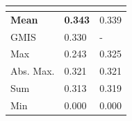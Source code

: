 \begin{figure}
\begin{minipage}[T]{0.48\textwidth}
\begin{tabular}{l M{0.25\textwidth} M{0.25\textwidth}}
         &  &  \\ \midrule
\textbf{Mean}& \textbf{0.343}  & 0.339  \\
GMIS \cite{liu2018affinity} & 0.330 & -  \\
Max &   0.243  &   0.325  \\
Abs. Max.  & 0.321 & 0.321 \\
Sum & 0.313  & 0.319  \\
Min &  0.000    & 0.000  \\
        \end{tabular}
    \label{tab:results_cityscapes}
\end{minipage}
\end{figure}

